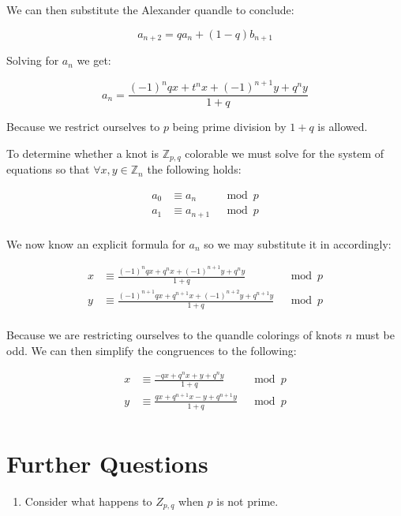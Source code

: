 \documentclass[12pt]{article}
\begin{document}
We can then substitute the Alexander quandle to conclude:

$$ a_{n+2} = qa_{n} + (1-q)b_{n+1} $$

Solving for $a_n$ we get:

$$ a_n = \frac{(-1)^nqx+t^nx+(-1)^{n+1}y+q^ny}{1+q} $$

Because we restrict ourselves to $p$ being prime division by $1+q$ is allowed.

To determine whether a knot is $\mathbb{Z}_{p,q}$ colorable we must solve for the system of equations so that $\forall x,y \in \mathbb{Z}_n$ the following holds:

\begin{align*}
	a_0 &\equiv a_{n}  & \mod{p} \\
	a_1 &\equiv a_{n+1} & \mod{p} \\
\end{align*}

We now know an explicit formula for $a_n$ so we may substitute it in accordingly:

\begin{align*}
	x &\equiv \frac{(-1)^nqx+q^nx+(-1)^{n+1}y+q^ny}{1+q} & \mod{p} \\
	y &\equiv \frac{(-1)^{n+1}qx+q^{n+1}x+(-1)^{n+2}y+q^{n+1}y}{1+q} & \mod{p} \\
\end{align*}

Because we are restricting ourselves to the quandle colorings of knots $n$ must be odd. We can then simplify the congruences to the following:

\begin{align*} 
	x &\equiv \frac{-qx+q^nx+y+q^ny}{1+q} & \mod{p} \\
	y &\equiv \frac{qx+q^{n+1}x-y+q^{n+1}y}{1+q} & \mod{p} \\
\end{align*}

\section{Further Questions}\label{fqs}

\begin{enumerate}
	\item Consider what happens to $Z_{p,q}$ when $p$ is not prime.
\end{enumerate}



\end{document}
